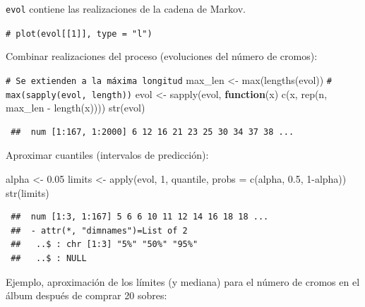 \documentclass[
  10pt,
]{book}
\newenvironment{Shaded}{\begin{snugshade}}{\end{snugshade}}
\newcommand{\AttributeTok}[1]{\textcolor[rgb]{0.77,0.63,0.00}{#1}}
\newcommand{\CommentTok}[1]{\textcolor[rgb]{0.56,0.35,0.01}{\textit{#1}}}
\newcommand{\ControlFlowTok}[1]{\textcolor[rgb]{0.13,0.29,0.53}{\textbf{#1}}}
\newcommand{\DecValTok}[1]{\textcolor[rgb]{0.00,0.00,0.81}{#1}}
\newcommand{\FloatTok}[1]{\textcolor[rgb]{0.00,0.00,0.81}{#1}}
\newcommand{\FunctionTok}[1]{\textcolor[rgb]{0.00,0.00,0.00}{#1}}
\newcommand{\NormalTok}[1]{#1}
\newcommand{\OtherTok}[1]{\textcolor[rgb]{0.56,0.35,0.01}{#1}}
\newcommand{\SpecialCharTok}[1]{\textcolor[rgb]{0.00,0.00,0.00}{#1}}
\theoremstyle{break}
\theoremstyle{nonumberplain}
\renewcommand{\CommentTok}[1]{\textcolor[rgb]{0.41,0.41,0.41}{\texttt{#1}}}
\begin{document}
\texttt{evol} contiene las realizaciones de la cadena de Markov.

\begin{Shaded}
\begin{Highlighting}[]
\CommentTok{\# plot(evol[[1]], type = "l")}
\end{Highlighting}
\end{Shaded}

Combinar realizaciones del proceso (evoluciones del número de cromos):

\begin{Shaded}
\begin{Highlighting}[]
\CommentTok{\# Se extienden a la máxima longitud}
\NormalTok{max\_len }\OtherTok{\textless{}{-}} \FunctionTok{max}\NormalTok{(}\FunctionTok{lengths}\NormalTok{(evol)) }\CommentTok{\# max(sapply(evol, length))}
\NormalTok{evol }\OtherTok{\textless{}{-}} \FunctionTok{sapply}\NormalTok{(evol, }\ControlFlowTok{function}\NormalTok{(x) }\FunctionTok{c}\NormalTok{(x, }\FunctionTok{rep}\NormalTok{(n, max\_len }\SpecialCharTok{{-}} \FunctionTok{length}\NormalTok{(x))))}
\FunctionTok{str}\NormalTok{(evol)}
\end{Highlighting}
\end{Shaded}

\begin{verbatim}
 ##  num [1:167, 1:2000] 6 12 16 21 23 25 30 34 37 38 ...
\end{verbatim}

Aproximar cuantiles (intervalos de predicción):

\begin{Shaded}
\begin{Highlighting}[]
\NormalTok{alpha }\OtherTok{\textless{}{-}} \FloatTok{0.05}
\NormalTok{limits }\OtherTok{\textless{}{-}} \FunctionTok{apply}\NormalTok{(evol, }\DecValTok{1}\NormalTok{, quantile, }\AttributeTok{probs =} \FunctionTok{c}\NormalTok{(alpha, }\FloatTok{0.5}\NormalTok{, }\DecValTok{1}\SpecialCharTok{{-}}\NormalTok{alpha))}
\FunctionTok{str}\NormalTok{(limits)}
\end{Highlighting}
\end{Shaded}

\begin{verbatim}
 ##  num [1:3, 1:167] 5 6 6 10 11 12 14 16 18 18 ...
 ##  - attr(*, "dimnames")=List of 2
 ##   ..$ : chr [1:3] "5%" "50%" "95%"
 ##   ..$ : NULL
\end{verbatim}

Ejemplo, aproximación de los límites (y mediana) para el número de cromos en el álbum después de comprar 20 sobres:
\end{document}
